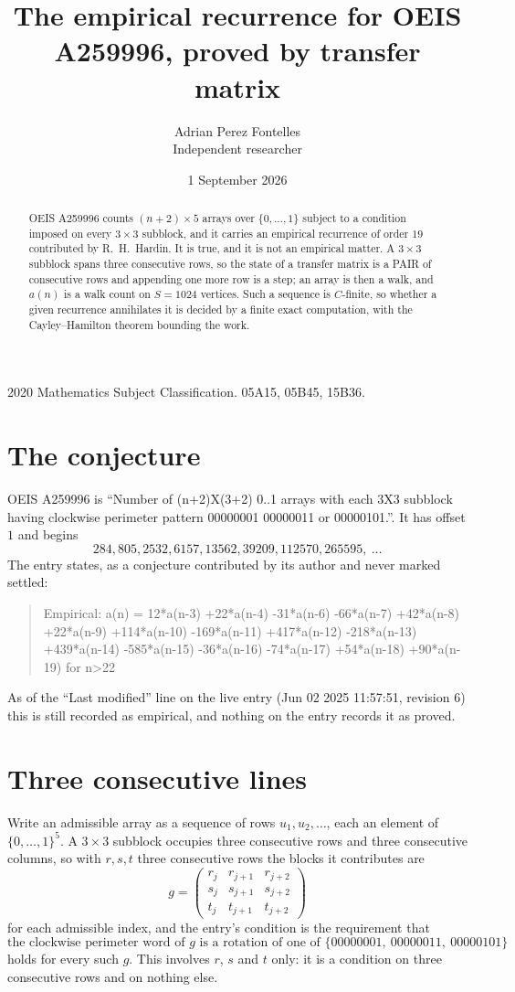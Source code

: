 \documentclass[11pt,a4paper]{article}
\title{The empirical recurrence for OEIS A259996, proved by transfer matrix}
\author{Adrian Perez Fontelles\\ \small Independent researcher}
\date{1 September 2026}
\theoremstyle{plain}
\theoremstyle{definition}
\begin{document}
\maketitle

\begin{abstract}
OEIS A259996 counts $(n+2)\times5$ arrays over $\{0,\dots,1\}$ subject to a condition imposed on
every $3\times3$ subblock, and it carries an empirical recurrence of order $19$
contributed by R.~H.~Hardin. It is true, and it is not an empirical matter. A $3\times3$
subblock spans three consecutive rows, so the state of a transfer matrix is a PAIR of
consecutive rows and appending one more row is a step; an array is then a walk, and
$a(n)$ is a walk count on $S=1024$ vertices. Such a sequence is $C$-finite, so whether a given
recurrence annihilates it is decided by a finite exact computation, with the Cayley--Hamilton
theorem bounding the work.
\end{abstract}

\noindent\small 2020 Mathematics Subject Classification. 05A15, 05B45, 15B36.\normalsize

\section{The conjecture}

OEIS A259996 is ``Number of (n+2)X(3+2) 0..1 arrays with each 3X3 subblock having clockwise perimeter pattern 00000001 00000011 or 00000101.''. It has offset $1$ and begins
\[
284, 805, 2532, 6157, 13562, 39209, 112570, 265595,\ \dots
\]
The entry states, as a conjecture contributed by its author and never marked settled:
\begin{quote}
Empirical: a(n) = 12*a(n-3) +22*a(n-4) -31*a(n-6) -66*a(n-7) +42*a(n-8) +22*a(n-9) +114*a(n-10) -169*a(n-11) +417*a(n-12) -218*a(n-13) +439*a(n-14) -585*a(n-15) -36*a(n-16) -74*a(n-17) +54*a(n-18) +90*a(n-19) for n>22
\end{quote}
As of the ``Last modified'' line on the live entry (Jun 02 2025 11:57:51, revision 6) this is still
recorded as empirical, and nothing on the entry records it as proved.

\section{Three consecutive lines}

Write an admissible array as a sequence of rows $u_1,u_2,\dots$, each an element of
$\{0,\dots,1\}^{5}$. A $3\times3$ subblock occupies three consecutive rows and
three consecutive columns, so with $r,s,t$ three consecutive rows the blocks it
contributes are
\[
g=\begin{pmatrix}r_j&r_{j+1}&r_{j+2}\\ s_j&s_{j+1}&s_{j+2}\\ t_j&t_{j+1}&t_{j+2}\end{pmatrix}
\]
for each admissible index, and the entry's condition is the requirement that
\[
\text{the clockwise perimeter word of }g\text{ is a rotation of one of }\{00000001,\ 00000011,\ 00000101\}
\]
holds for every such $g$. This involves $r$, $s$ and $t$ only: it is a condition on
three consecutive rows and on nothing else.
\end{document}
